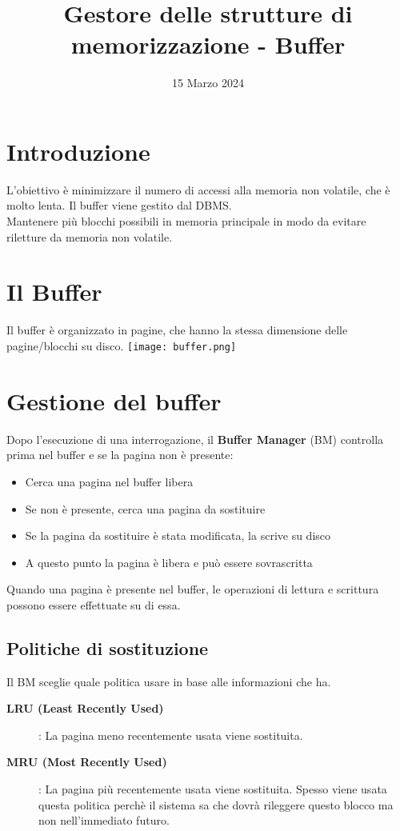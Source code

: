 \documentclass[12pt]{article}
\title{Gestore delle strutture di memorizzazione - Buffer}
\date{15 Marzo 2024}
\begin{document}
\maketitle
\section{Introduzione}
L'obiettivo è minimizzare il numero di accessi alla memoria non volatile, che è molto lenta. Il buffer viene gestito dal DBMS.\\
Mantenere più blocchi possibili in memoria principale in modo da evitare riletture da memoria non volatile.
\section{Il Buffer}
Il buffer è organizzato in pagine, che hanno la stessa dimensione delle pagine/blocchi su disco.
\texttt{[image: buffer.png]}
\section{Gestione del buffer}
Dopo l'esecuzione di una interrogazione, il \textbf{Buffer Manager} (BM) controlla prima nel buffer e se la pagina non è presente:
\begin{itemize}
    \item Cerca una pagina nel buffer libera
    \item Se non è presente, cerca una pagina da sostituire
    \item Se la pagina da sostituire è stata modificata, la scrive su disco
    \item A questo punto la pagina è libera e può essere sovrascritta
\end{itemize}
Quando una pagina è presente nel buffer, le operazioni di lettura e scrittura possono essere effettuate su di essa.
\subsection{Politiche di sostituzione}
Il BM sceglie quale politica usare in base alle informazioni che ha.
\begin{description}
    \item[\textbf{LRU (Least Recently Used)}]: La pagina meno recentemente usata viene sostituita. 
    \item[\textbf{MRU (Most Recently Used)}]: La pagina più recentemente usata viene sostituita. Spesso viene usata questa politica perchè il sistema sa che dovrà rileggere questo blocco ma non nell'immediato futuro.
\end{description}
\end{document}
